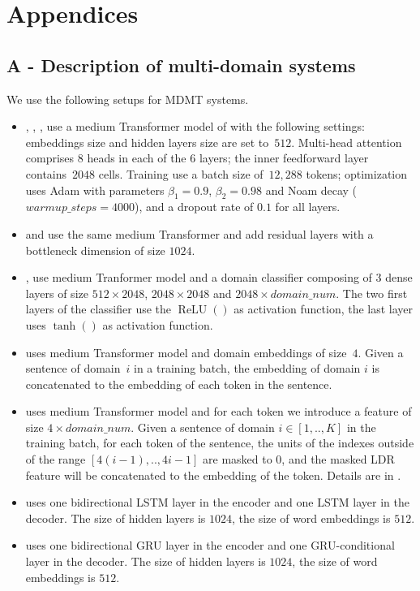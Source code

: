 \clearpage{}

\section*{Appendices}

\subsection*{A - Description of multi-domain systems \label{ssec:implementation-details}}

We use the following setups for MDMT systems.
\begin{itemize}
\item {}, , ,  use a medium Transformer model of \cite{Vaswani17attention} with the following settings: embeddings size and hidden layers size are set to~$512$. Multi-head attention comprises 8 heads in each of the 6 layers; the inner feedforward layer contains~$2048$ cells. 
Training use a batch size of~$12,288$ tokens; optimization uses Adam with parameters $\beta_1=0.9$, $\beta_2= 0.98$ and Noam decay ($warmup\_steps=4000$), and a dropout rate of $0.1$ for all layers.
\item {} and  use the same medium Transformer and add residual layers with a bottleneck dimension of size $1024$.
\item {},  use medium Tranformer model and a domain classifier composing of 3 dense layers of size $512 \times 2048$, $2048 \times 2048$ and $2048 \times domain\_num$. The two first layers of the classifier use the $\operatorname{ReLU}()$ as activation function, the last layer uses $\tanh()$ as activation function.
\item {} uses medium Transformer model and domain embeddings of size~$4$. Given a sentence of domain~$i$ in a training batch, the embedding of domain $i$ is concatenated to the embedding of each token in the sentence.
\item {} uses medium Transformer model and for each token we introduce a  feature of size $4 \times domain\_num$. Given a sentence of domain $i\in[1,..,K]$ in the training batch, for each token of the sentence, the  units of the indexes outside of the range $[4(i-1),..,4i-1]$ are masked to $0$, and the masked LDR feature will be concatenated to the embedding of the token. Details are in \cite{Pham19generic}.
\item {} uses one bidirectional LSTM layer in the encoder and one LSTM layer in the decoder. The size of hidden layers is $1024$, the size of word embeddings is $512$. 
\item {} uses one bidirectional GRU layer in the encoder and one GRU-conditional layer in the decoder. The size of hidden layers is $1024$, the size of word embeddings is $512$.
\end{itemize}
